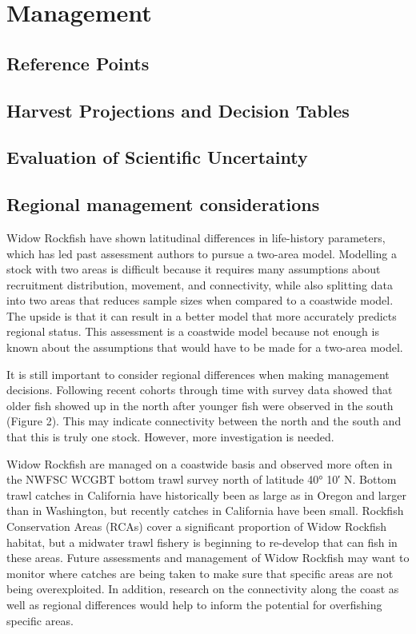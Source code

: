 \documentclass[
]{scrartcl}
\begin{document}
\newpage{}

\section{Management}\label{management}

\subsection{Reference Points}\label{reference-points-1}

\subsection{Harvest Projections and Decision
Tables}\label{harvest-projections-and-decision-tables}

\subsection{Evaluation of Scientific
Uncertainty}\label{evaluation-of-scientific-uncertainty}

\subsection{Regional management
considerations}\label{regional-management-considerations}

Widow Rockfish have shown latitudinal differences in life-history
parameters, which has led past assessment authors to pursue a two-area
model. Modelling a stock with two areas is difficult because it requires
many assumptions about recruitment distribution, movement, and
connectivity, while also splitting data into two areas that reduces
sample sizes when compared to a coastwide model. The upside is that it
can result in a better model that more accurately predicts regional
status. This assessment is a coastwide model because not enough is known
about the assumptions that would have to be made for a two-area model.

It is still important to consider regional differences when making
management decisions. Following recent cohorts through time with survey
data showed that older fish showed up in the north after younger fish
were observed in the south (Figure 2). This may indicate connectivity
between the north and the south and that this is truly one stock.
However, more investigation is needed.

Widow Rockfish are managed on a coastwide basis and observed more often
in the NWFSC WCGBT bottom trawl survey north of latitude 40° 10′ N.
Bottom trawl catches in California have historically been as large as in
Oregon and larger than in Washington, but recently catches in California
have been small. Rockfish Conservation Areas (RCAs) cover a significant
proportion of Widow Rockfish habitat, but a midwater trawl fishery is
beginning to re-develop that can fish in these areas. Future assessments
and management of Widow Rockfish may want to monitor where catches are
being taken to make sure that specific areas are not being
overexploited. In addition, research on the connectivity along the coast
as well as regional differences would help to inform the potential for
overfishing specific areas.
\end{document}
